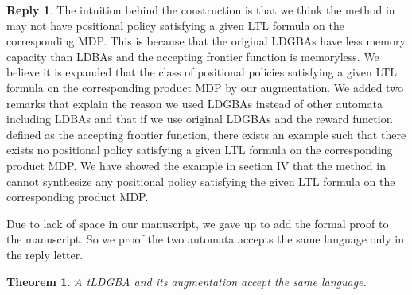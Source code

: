 \documentclass[10 pt, dvipdfmx]{article}
\newtheorem{theorem}{Theorem}
\theoremstyle{definition}
\newtheorem{review point}{Review Point}[section]
\newtheorem*{reply}{Reply}
\begin{document}
\begin{reply}
  The intuition behind the construction is that we think the method in \cite{HAK2019} may not have positional policy satisfying a given LTL formula on the corresponding MDP.
  This is because that the original LDGBAs have less memory capacity than LDBAs and the accepting frontier function is memoryless. We believe it is expanded that the class of positional policies satisfying a given LTL formula on the corresponding product MDP by our augmentation. We added two remarks that explain the reason we used LDGBAs instead of other automata including LDBAs and that if we use original LDGBAs and the reward function defined as the accepting frontier function, there exists an example such that there exists no positional policy satisfying a given LTL formula on the corresponding product MDP. We have showed the example in section IV that the method in \cite{HAK2019} cannot synthesize any positional policy satisfying the given LTL formula on the corresponding product MDP.

  Due to lack of space in our manuscript, we gave up to add the formal proof to the manuscript. So we proof the two automata accepts the same language only in the reply letter.

  \begin{theorem}
    A tLDGBA and its augmentation accept the same language.
  \end{theorem}


\end{reply}
\end{document}
